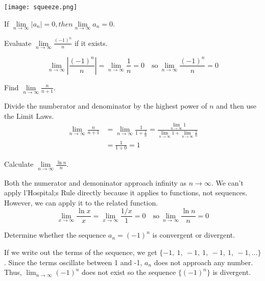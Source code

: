   \begin{center}
    \texttt{[image: squeeze.png]}
  \end{center}
  \begin{theorem}
    If $\lim\limits_{n\to\infty}|a_n| = 0, then \lim\limits_{n\to\infty}a_n = 0$.
  \end{theorem}
  \begin{example}
    Evaluate $\lim\limits_{n\to\infty}\frac{(-1)^n}{n}$ if it exists.
  \end{example}
  \begin{solution}
    $$\lim_{n\to\infty}\left|\frac{(-1)^n}{n}\right|=\lim_{n\to\infty}\frac{1}{n}=0 \quad \text{so}\ \lim_{n\to\infty}\frac{(-1)^n}{n}=0$$
  \end{solution}
  \begin{example}
    Find $\lim\limits_{n \to \infty} \frac{n}{n+1}$.
  \end{example}
  \begin{solution}
    Divide the numberator and denominator by the highest power of $n$ and then use the Limit Laws.
    \begin{align*}
        \lim_{n \to \infty} \frac{n}{n+1} &= \lim_{n \to \infty} \frac{1}{1+\frac{1}{n}} = \frac{\lim\limits_{n \to \infty} 1}{\lim\limits_{n \to \infty}1+\lim\limits_{n \to \infty}\frac{1}{n}} \\
        &= \frac{1}{1+0}=1
    \end{align*}
  \end{solution}
  \begin{example}
    Calculate $\lim\limits_{n \to \infty} \frac{\ln n}{n}$.
  \end{example}
  \begin{solution}
    Both the numerator and demoninator approach infinity as $n\to\infty$. We can't apply l'Hospital;s Rule directly because it applies to functions, not sequences. However, we can apply it to the related function.
    \begin{equation*}
        \lim_{x \to \infty} \frac{\ln x}{x} = \lim_{x \to \infty} \frac{1/x}{1} = 0 \quad \text{so}\ \lim\limits_{n \to \infty} \frac{\ln n}{n} = 0
    \end{equation*}
  \end{solution}
  \begin{example}
    Determine whether the sequence $a_n = (-1)^n$ is convergent or divergent.
  \end{example}
  \begin{solution}
    If we write out the terms of the sequence, we get $\{-1,\ 1,\ -1,\ 1,\ -1,\ 1,\ -1,\ldots\}$. Since the terms oscillate between 1 and -1, $a_n$ does not approach any number. Thus, $\lim_{n\to\infty}(-1)^n$ does not exist so the sequence $\{(-1)^n\}$ is divergent.
  \end{solution}
